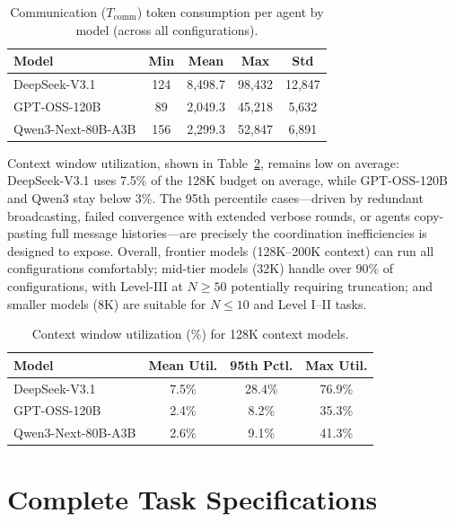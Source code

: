 \begin{table}[t]
\centering
\small
\renewcommand{\arraystretch}{1.2}
\begin{tabular}{@{}l cccc@{}}
\toprule
\textbf{Model} & \textbf{Min} & \textbf{Mean} & \textbf{Max} & \textbf{Std} \\
\midrule
DeepSeek-V3.1 & 124 & 8,498.7 & 98,432 & 12,847 \\
GPT-OSS-120B & 89 & 2,049.3 & 45,218 & 5,632 \\
Qwen3-Next-80B-A3B & 156 & 2,299.3 & 52,847 & 6,891 \\
\bottomrule
\end{tabular}
\caption{Communication ($T_{\text{comm}}$) token consumption per agent by model (across all configurations).}
\label{tab:token_comm}
\end{table}

Context window utilization, shown in Table~\ref{tab:context_util}, remains low on average: DeepSeek-V3.1 uses 7.5\% of the 128K budget on average, while GPT-OSS-120B and Qwen3 stay below 3\%. The 95th percentile cases---driven by redundant broadcasting, failed convergence with extended verbose rounds, or agents copy-pasting full message histories---are precisely the coordination inefficiencies \silobench{} is designed to expose. Overall, frontier models (128K--200K context) can run all configurations comfortably; mid-tier models (32K) handle over 90\% of configurations, with Level-III at $N{\geq}50$ potentially requiring truncation; and smaller models (8K) are suitable for $N{\leq}10$ and Level I--II tasks.

\begin{table}[t]
\centering
\small
\renewcommand{\arraystretch}{1.15}
\begin{tabular}{@{}l ccc@{}}
\toprule
\textbf{Model} & \textbf{Mean Util.} & \textbf{95th Pctl.} & \textbf{Max Util.} \\
\midrule
DeepSeek-V3.1 & 7.5\% & 28.4\% & 76.9\% \\
GPT-OSS-120B & 2.4\% & 8.2\% & 35.3\% \\
Qwen3-Next-80B-A3B & 2.6\% & 9.1\% & 41.3\% \\
\bottomrule
\end{tabular}
\caption{Context window utilization (\%) for 128K context models.}
\label{tab:context_util}
\end{table}


\section{Complete Task Specifications}
\label{app:tasks}

